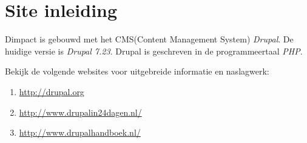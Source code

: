 
\section{Site inleiding}\label{siteinleiding}
Dimpact is gebouwd met het CMS(Content Management System) \emph{Drupal}. De huidige versie is \emph{Drupal 7.23}.
Drupal is geschreven in de programmeertaal \emph{PHP}.

Bekijk de volgende websites voor uitgebreide informatie en naslagwerk:

\begin{enumerate}
\item \url{http://drupal.org}
\item \url{http://www.drupalin24dagen.nl/}
\item \url{http://www.drupalhandboek.nl/}
\end{enumerate}



